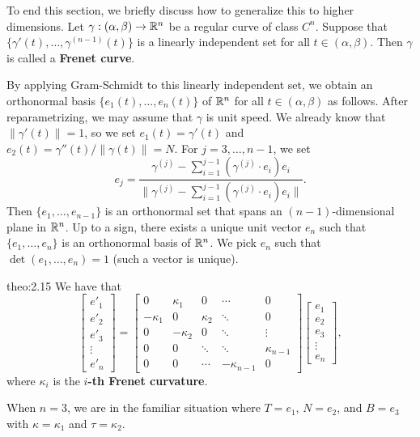 To end this section, we briefly discuss how to generalize this to higher dimensions. 
Let $\gamma : (\alpha, \beta) \to \mathbb{R}^n$ be a regular curve of class $C^n$. 
Suppose that $\{\gamma'(t), \dots, \gamma^{(n-1)}(t)\}$ is a linearly 
independent set for all $t \in (\alpha, \beta)$. Then $\gamma$ 
is called a {\bf Frenet curve}. 

By applying Gram-Schmidt to this linearly independent set, we obtain an orthonormal 
basis $\{e_1(t), \dots, e_n(t)\}$ of $\mathbb{R}^n$ for all $t \in (\alpha, \beta)$ 
as follows. After reparametrizing, we may assume that $\gamma$ is unit speed. 
We already know that $\|\gamma'(t)\| = 1$, so we set $e_1(t) = \gamma'(t)$ and 
$e_2(t) = \gamma''(t)/\|\gamma(t)\| = N$. For $j = 3, \dots, n-1$, we set 
\[ e_j = \frac{\gamma^{(j)} - \sum_{i=1}^{j-1}(\gamma^{(j)} \cdot e_i)e_i}
{\|\gamma^{(j)} - \sum_{i=1}^{j-1}(\gamma^{(j)} \cdot e_i)e_i\|}. \] 
Then $\{e_1, \dots, e_{n-1}\}$ is an orthonormal set that spans an 
$(n-1)$-dimensional plane in $\mathbb{R}^n$. Up to a sign, there exists a unique 
unit vector $e_n$ such that $\{e_1, \dots, e_n\}$ is an orthonormal basis 
of $\mathbb{R}^n$. We pick $e_n$ such that $\det(e_1, \dots, e_n) = 1$ (such a 
vector is unique). 

\begin{theo}{theo:2.15}
    We have that 
    \[ \begin{bmatrix}
        e'_1 \\[5pt] e'_2 \\[5pt] e'_3 \\[5pt] \vdots \\[5pt] e'_n 
    \end{bmatrix} = \begin{bmatrix}
        0 & \kappa_1 & 0 & \cdots & 0 \\ 
        -\kappa_1 & 0 & \kappa_2 & \ddots & 0 \\ 
        0 & -\kappa_2 & 0 & \ddots & \vdots \\ 
        0 & 0 & \ddots & \ddots & \kappa_{n-1} \\[5pt] 
        0 & 0 & \cdots & -\kappa_{n-1} & 0
    \end{bmatrix} \begin{bmatrix}
        e_1 \\[5pt] e_2 \\[5pt] e_3 \\[5pt] \vdots \\[5pt] e_n
    \end{bmatrix}, \] 
    where $\kappa_i$ is the {\bf $i$-th Frenet curvature}. 
\end{theo}\vspace{-0.25cm}

When $n = 3$, we are in the familiar situation where 
$T = e_1$, $N = e_2$, and $B = e_3$ with $\kappa = \kappa_1$ and 
$\tau = \kappa_2$. 